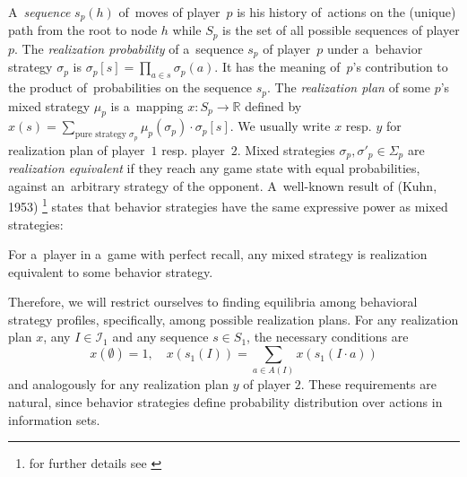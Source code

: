 A~\emph{sequence} $s_p(h)$ of~moves of player~$p$ is his history of~actions on the (unique) path from the root to node $h$ while $S_p$ is the set of all possible sequences of player $p$.
The \emph{realization probability} of a~sequence $s_p$ of player~$p$ under a~behavior strategy $\sigma _p$ is $\sigma _p [s] = \prod_{a \in s} \sigma _p(a)$.
It has the meaning of~$p$'s contribution to the product of~probabilities on the sequence $s_p$.
The \emph{realization plan} of some $p$'s mixed strategy $\mu_p$ is a~mapping $x\colon S_p \to \mathbb{R}$ defined by
$x(s) = \sum _{\textrm{pure strategy } \sigma _p} \mu _p (\sigma _p) \cdot \sigma _p [s]$.
We usually write $x$ resp. $y$ for realization plan of player~$1$ resp. player~$2$.
Mixed strategies $\sigma _p, \sigma' _p \in \Sigma _p$ are \emph{realization equivalent} if they reach any game state with equal probabilities, against an~arbitrary strategy of the opponent.
A~well-known result of (Kuhn, 1953)%
\footnote{for further details see \cite{AGT07}}
states that behavior strategies have the same expressive power as mixed strategies:
\begin{thm}
For a~player in a~game with perfect recall, any mixed strategy is realization equivalent to some behavior strategy.
\end{thm}
Therefore, we will restrict ourselves to finding equilibria among behavioral strategy profiles, specifically, among possible realization plans.
For any realization plan $x$, any $I \in \mathcal{I}_1$ and any sequence $s\in S_1$, the necessary conditions are
\begin{equation}
\label{seq-cond}
    x(\emptyset) = 1, \quad x(s_1(I)) = \sum _{a \in A(I)} x(s_1(I \cdot a))
\end{equation}
and analogously for any realization plan $y$ of player $2$.
These requirements are natural, since behavior strategies define probability distribution over actions in information sets.

